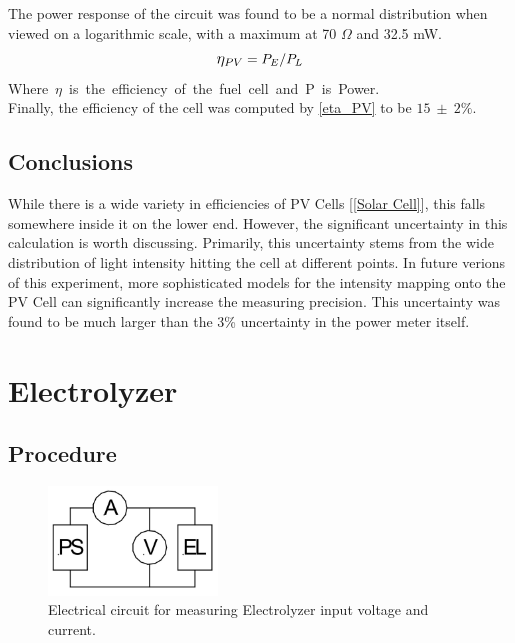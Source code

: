 \documentclass[aps,prl,reprint]{revtex4-2}
\begin{document}
The power response of the circuit was found to be a normal distribution when 
viewed on a logarithmic scale, with a maximum at 70 $\Omega$ and 32.5 mW. \\

\newpage
\begin{equation}
    \mathlarger{\eta_{PV}}=P_E/P_L
    \label{eta_PV}
\end{equation}
Where\ $\eta$\ is\ the\ efficiency\ of\ the\ fuel\ cell\ and\ P\ is\ Power.\\

Finally, the efficiency of the cell was computed by \ref{eta_PV} to be $15\ \pm\ 2\%$.

\subsection{Conclusions}
While there is a wide variety in efficiencies of PV Cells [\ref{Solar Cell}],
this falls somewhere inside it on the lower end. However, the significant 
uncertainty in this 
calculation is worth discussing. Primarily, this uncertainty stems from the 
wide distribution of light intensity hitting the cell at different points. In 
future verions of this experiment, more sophisticated models for the intensity
mapping onto the PV Cell can significantly increase the measuring precision. 
This uncertainty was found to be much larger than the 3\% uncertainty in the 
power meter itself. \\




\section{Electrolyzer}

\subsection{Procedure}

\begin{figure}[h]
\includegraphics[width=0.4\textwidth]{../Images/l1_PartB.jpg}
\caption{\label{figB}Electrical circuit for measuring Electrolyzer input voltage and current.}
\end{figure}
\end{document}
